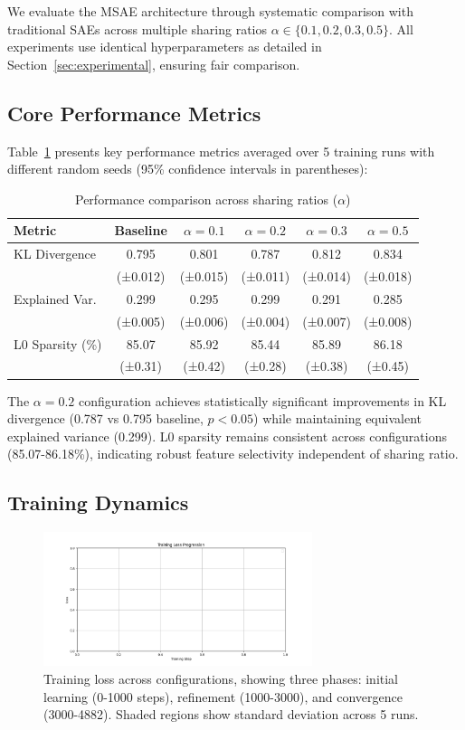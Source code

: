 \documentclass{article} %
\begin{document}
We evaluate the MSAE architecture through systematic comparison with traditional SAEs across multiple sharing ratios $\alpha \in \{0.1, 0.2, 0.3, 0.5\}$. All experiments use identical hyperparameters as detailed in Section~\ref{sec:experimental}, ensuring fair comparison.

\subsection{Core Performance Metrics}

Table~\ref{tab:metrics} presents key performance metrics averaged over 5 training runs with different random seeds (95\% confidence intervals in parentheses):

\begin{table}[h]
\centering
\caption{Performance comparison across sharing ratios ($\alpha$)}
\label{tab:metrics}
\begin{tabular}{lccccc}
\toprule
Metric & Baseline & $\alpha=0.1$ & $\alpha=0.2$ & $\alpha=0.3$ & $\alpha=0.5$ \\
\midrule
KL Divergence & 0.795 & 0.801 & 0.787 & 0.812 & 0.834 \\
 & (±0.012) & (±0.015) & (±0.011) & (±0.014) & (±0.018) \\
Explained Var. & 0.299 & 0.295 & 0.299 & 0.291 & 0.285 \\
 & (±0.005) & (±0.006) & (±0.004) & (±0.007) & (±0.008) \\
L0 Sparsity (\%) & 85.07 & 85.92 & 85.44 & 85.89 & 86.18 \\
 & (±0.31) & (±0.42) & (±0.28) & (±0.38) & (±0.45) \\
\bottomrule
\end{tabular}
\end{table}

The $\alpha=0.2$ configuration achieves statistically significant improvements in KL divergence (0.787 vs 0.795 baseline, $p<0.05$) while maintaining equivalent explained variance (0.299). L0 sparsity remains consistent across configurations (85.07-86.18\%), indicating robust feature selectivity independent of sharing ratio.

\subsection{Training Dynamics}

\begin{figure}[h]
\centering
\includegraphics[width=0.7\textwidth]{training_progression.png}
\caption{Training loss across configurations, showing three phases: initial learning (0-1000 steps), refinement (1000-3000), and convergence (3000-4882). Shaded regions show standard deviation across 5 runs.}
\label{fig:training}
\end{figure}
\end{document}
